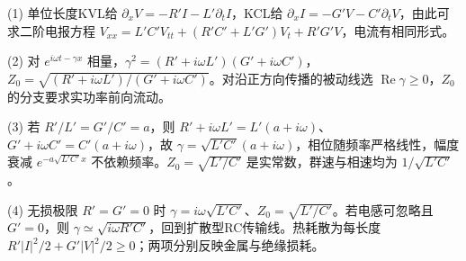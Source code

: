 (1) 单位长度KVL给 \(\partial_xV=-R'I-L'\partial_tI\)，KCL给 \(\partial_xI=-G'V-C'\partial_tV\)，由此可求二阶电报方程 \(V_{xx}=L'C'V_{tt}+(R'C'+L'G')V_t+R'G'V\)，电流有相同形式。

(2) 对 \(e^{i\omega t-\gamma x}\) 相量，\(\gamma^2=(R'+i\omega L')(G'+i\omega C')\)，\(\boxed{Z_0=\sqrt{(R'+i\omega L')/(G'+i\omega C')}}\)。对沿正方向传播的被动线选 \(\operatorname{Re}\gamma\ge0\)，\(Z_0\) 的分支要求实功率前向流动。

(3) 若 \(R'/L'=G'/C'=a\)，则 \(R'+i\omega L'=L'(a+i\omega)\)、\(G'+i\omega C'=C'(a+i\omega)\)，故 \(\gamma=\sqrt{L'C'}(a+i\omega)\)，相位随频率严格线性，幅度衰减 \(e^{-a\sqrt{L'C'}x}\) 不依赖频率。\(Z_0=\sqrt{L'/C'}\) 是实常数，群速与相速均为 \(1/\sqrt{L'C'}\)。

(4) 无损极限 \(R'=G'=0\) 时 \(\gamma=i\omega\sqrt{L'C'}\)、\(Z_0=\sqrt{L'/C'}\)。若电感可忽略且 \(G'=0\)，则 \(\gamma\simeq\sqrt{i\omega R'C'}\)，回到扩散型RC传输线。热耗散为每长度 \(R'|I|^2/2+G'|V|^2/2\ge0\)；两项分别反映金属与绝缘损耗。
